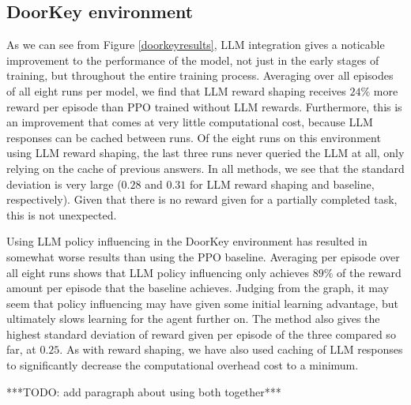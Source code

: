 \documentclass[conference]{IEEEtran}
\begin{document}
\subsection{DoorKey environment}

As we can see from Figure \ref{doorkeyresults}, LLM integration gives a noticable improvement to the performance of the model, not just in the early stages of training, but throughout the entire training process. Averaging over all episodes of all eight runs per model, we find that LLM reward shaping receives $24\%$ more reward per episode than PPO trained without LLM rewards. Furthermore, this is an improvement that comes at very little computational cost, because LLM responses can be cached between runs. Of the eight runs on this environment using LLM reward shaping, the last three runs never queried the LLM at all, only relying on the cache of previous answers. In all methods, we see that the standard deviation is very large ($0.28$ and $0.31$ for LLM reward shaping and baseline, respectively). Given that there is no reward given for a partially completed task, this is not unexpected.


Using LLM policy influencing in the DoorKey environment has resulted in somewhat worse results than using the PPO baseline. Averaging per episode over all eight runs shows that LLM policy influencing only achieves $89\%$ of the reward amount per episode that the baseline achieves. Judging from the graph, it may seem that policy influencing may have given some initial learning advantage, but ultimately slows learning for the agent further on. The method also gives the highest standard deviation of reward given per episode of the three compared so far, at $0.25$. As with reward shaping, we have also used caching of LLM responses to significantly decrease the computational overhead cost to a minimum. 

***TODO: add paragraph about using both together*** 
\end{document}
